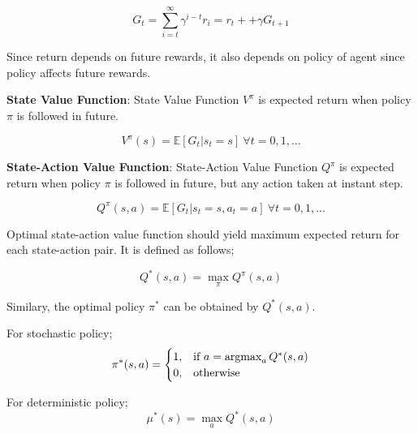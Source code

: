 \begin{equation}
G_t = \sum_{i=t}^{\infty} \gamma^{i-t} r_i = r_t + + \gamma G_{t+1}
\end{equation}

Since return depends on future rewards, it also depends on policy of agent since policy affects future rewards.

\textbf{State Value Function}: State Value Function $V^{\pi}$ is expected return when policy $\pi$ is followed in future.

\begin{equation}
V^{\pi}(s) = \mathbb{E}[G_t|s_t=s] \: \forall t = 0,1, ...
\end{equation}

\textbf{State-Action Value Function}: State-Action Value Function $Q^{\pi}$ is expected return when policy $\pi$ is followed in future, but any action taken at instant step.

\begin{equation}
Q^{\pi}(s,a) = \mathbb{E}[G_t|s_t=s, a_t=a] \: \forall t = 0,1, ...
\end{equation}

Optimal state-action value function should yield maximum expected return for each state-action pair. It is defined as follows;

\begin{equation}
Q^{*}(s,a) = \max_{\pi} Q^{\pi}(s,a)
\end{equation}

Similary, the optimal policy $\pi^*$ can be obtained by $Q^{*}(s,a)$.

For stochastic policy;
\begin{equation}
\pi^{*}(s,a) = 
\begin{cases}
1,   & \text{if  } a = \operatorname{\textup{argmax}}_{a} Q^{*}(s,a) \\
0,   & \text{otherwise  }
\end{cases} 
\end{equation}

For deterministic policy;
\begin{equation}
\mu^{*}(s) = \max_{a} Q^{*}(s,a)
\end{equation}
